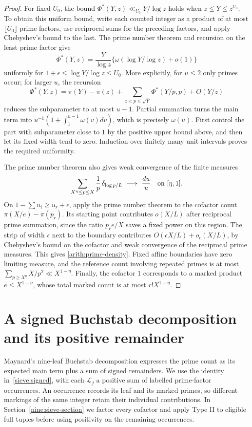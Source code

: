 \documentclass[11pt,a4paper]{article}
\theoremstyle{paperplain}
\numberwithin{equation}{section}
\begin{document}
\begin{proof}
For fixed $U_0$, the bound
$\Phi^*(Y,z)\ll_{U_0}Y/\log z$ holds when $z\le Y\le z^{U_0}$.
To obtain this uniform bound, write each counted integer as a product
of at most $\lfloor U_0\rfloor$ prime factors, use reciprocal sums for
the preceding factors, and apply Chebyshev's bound to the last.
The prime number theorem and recursion on the least prime factor give
\[
 \Phi^*(Y,z)=\frac Y{\log z}
       \{\omega(\log Y/\log z)+o(1)\}
\]
uniformly for $1+\epsilon\le\log Y/\log z\le U_0$.
More explicitly, for $u\le2$ only primes occur; for larger $u$, the
recursion
\[
 \Phi^*(Y,z)=\pi(Y)-\pi(z)
       +\sum_{z<p\le\sqrt Y}\Phi^*(Y/p,p)+O(Y/z)
\]
reduces the subparameter to at most $u-1$.
Partial summation turns the main term into
$u^{-1}(1+\int_1^{u-1}\omega(v)dv)$, which is precisely $\omega(u)$.
First control the part with subparameter close to $1$ by the positive
upper bound above, and then let its fixed width tend to zero.
Induction over finitely many unit intervals proves the required
uniformity.

The prime number theorem also gives weak convergence of the finite
measures
\[
 \sum_{X^\eta\le p\le X}\frac1p\,
          \delta_{\log p/L}\ \longrightarrow\ \frac{du}{u}
 \quad\hbox{on }[\eta,1].
\]
On $1-\sum u_i\ge u_r+\epsilon$, apply the prime number theorem to
the cofactor count $\pi(X/e)-\pi(p_r)$. Its starting point contributes
$o(X/L)$ after reciprocal prime summation, since the ratio $p_re/X$
saves a fixed power on this region. The strip of width $\epsilon$
next to the boundary contributes $O(\epsilon X/L)+o_\epsilon(X/L)$,
by Chebyshev's bound on the cofactor and weak convergence of the
reciprocal prime measures. This gives \eqref{arith:prime-density}.
Fixed affine boundaries have zero limiting measure, and the reference
count involving repeated primes is at most
$\sum_{p\ge X^\eta}X/p^2\ll X^{1-\eta}$.
Finally, the cofactor $1$ corresponds to a marked product
$e\le X^{1-\eta}$, whose total marked count is at most
$r!X^{1-\eta}$.
\end{proof}

\section{A signed Buchstab decomposition and its positive remainder}\label{sieve:section}

Maynard's nine-leaf Buchstab decomposition \cite[Section 6]{Maynard2019}
expresses the prime count as its expected main term plus a sum of signed
remainders. We use the identity in~\eqref{sieve:signed}, with each
$\mathcal L_j$ a positive sum of labelled prime-factor occurrences.
An occurrence records its leaf and its marked primes, so different
markings of the same integer retain their individual contributions.
In Section~\ref{nine:sieve-section} we factor every cofactor and apply
Type II to eligible full tuples before using positivity on the
remaining occurrences.
\end{document}
